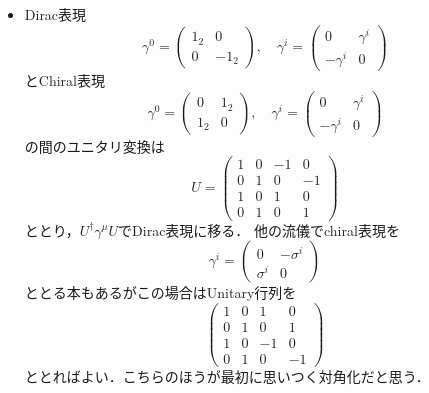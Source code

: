 \begin{itemize}
		\item Dirac表現
				\begin{equation}
						\gamma^0 
						=
						\begin{pmatrix}
								1_2 & 0\\
								0 & -1_2
						\end{pmatrix},\quad
						\gamma^i
						=
						\begin{pmatrix}
								0 & \gamma^i\\
								-\gamma^i & 0
						\end{pmatrix}
				\end{equation}
				とChiral表現
				\begin{equation}
						\gamma^0
						=
						\begin{pmatrix}
								0 & 1_2\\
								1_2 & 0
						\end{pmatrix},\quad
						\gamma^i
						=
						\begin{pmatrix}
								0 & \gamma^i\\
								-\gamma^i & 0
						\end{pmatrix}
				\end{equation}
				の間のユニタリ変換は
				\begin{equation}
						U =
				\begin{pmatrix}
						1 & 0 & -1 & 0\\
						0 & 1 & 0 & -1\\
						1 & 0 & 1 & 0\\
						0 & 1 & 0 & 1
				\end{pmatrix}
				\end{equation}
				ととり，$U^{\dagger}\gamma^{\mu}U $でDirac表現に移る．
				他の流儀でchiral表現を
				\begin{equation}
						\gamma^i = 
						\begin{pmatrix}
								0 & -\sigma^i\\
								\sigma^i & 0
						\end{pmatrix}
				\end{equation}
				ととる本もある\cite{BB17130464}がこの場合はUnitary行列を
				\begin{equation}
				\begin{pmatrix}
						1 & 0 & 1 & 0\\
						0 & 1 & 0 & 1\\
						1 & 0 & -1 & 0\\
						0 & 1 & 0 & -1
				\end{pmatrix}
				\end{equation}
				ととればよい．こちらのほうが最初に思いつく対角化だと思う．
\end{itemize}
